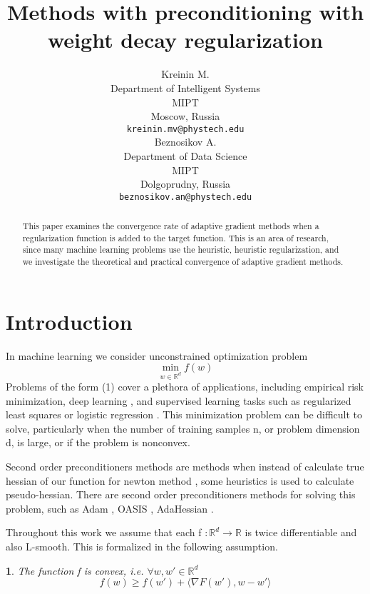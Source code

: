 \documentclass{article}
\title{Methods with preconditioning with weight decay regularization}
\author{ Kreinin M. \\
	Department of Intelligent Systems\\
	MIPT\\
	Moscow, Russia \\
	\texttt{kreinin.mv@phystech.edu} \\
	\And
	Beznosikov A. \\
	Department of Data Science\\
	MIPT\\
	Dolgoprudny, Russia \\
	\texttt{beznosikov.an@phystech.edu} \\
}
\date{}
\makeatletter
\newtheorem*{assumption*}{\assumptionnumber}
\providecommand{\assumptionnumber}{}
\newenvironment{assumption}[2]
 {%
  \renewcommand{\assumptionnumber}{\textbf{Assumption} #1 ({#2})}%
  \begin{assumption*}%
  \protected@edef\@currentlabel{#1-#2}%
 }
 {%
  \end{assumption*}
 }
\makeatother
\begin{document}
\maketitle

\begin{abstract}
	This paper examines the convergence rate of adaptive gradient methods when a regularization function is added to the target function. This is an area of research, since many machine learning problems use the heuristic, heuristic regularization, and we investigate the theoretical and practical convergence of adaptive gradient methods.
\end{abstract}


\section{Introduction}
In machine learning we consider unconstrained optimization problem
\begin{equation}
	\min_{w \in \mathbb{R}^d} f(w)
\end{equation}
Problems of the form (1) cover a plethora of applications, including empirical risk minimization,
deep learning \citep{lecun2015deep}, and supervised learning \citep{cunningham2008supervised} tasks such as regularized least squares \citep{rifkin2007notes} or logistic regression \citep{shalev2014understanding}. This minimization problem can be difficult to solve, particularly when the number of training
samples n, or problem dimension d, is large, or if the problem is nonconvex.

Second order preconditioners methods are methods when instead of calculate true hessian of our function for newton method \citep{dennis1977quasi}, some heuristics is used to calculate pseudo-hessian. There are second order preconditioners methods for solving this problem, such as Adam \citep{kingma2014adam} , OASIS \citep{goldberg2011oasis}, AdaHessian \citep{yao2021adahessian}. 

Throughout this work we assume that each f $:\mathbb{R}^d \rightarrow \mathbb{R}$ is twice differentiable and also L-smooth. This is formalized in the following assumption.

\begin{assumption}{1}{Convex}
	The function f is convex, i.e. $\forall w, w' \in \mathbb{R}^d$
	\begin{equation}
		f(w) \geq f(w') + \langle \nabla F(w'), w-w' \rangle
	\end{equation}
\end{assumption}
\end{document}
